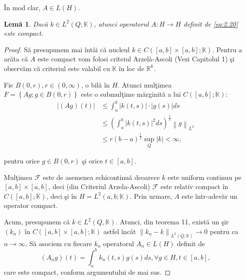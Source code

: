\documentclass[a4paper,12pt,oneside]{report}
\newtheorem{lemma}{Lem\u{a}}
\begin{document}
\noindent \^{I}n mod clar, \(A \in L\left ( H \right )\).

\begin{lemma}
Dac\u{a} \(k\in L^{2}\left ( Q;\mathbb{K} \right )\), atunci operatorul \(A : H \rightarrow H\) definit de \ref{eq:2.20} este compact.
\end{lemma}


\begin{proof}

S\u{a} presupunem mai \^{i}nt\^{a}i c\u{a} nucleul \(k \in C\left ( \left [ a,b \right ]  \times \left [ a,b \right ]; \mathbb{K}\right )\). Pentru a ar\u{a}ta c\u{a} \(A\) este compact  vom folosi criteiul Arzelà-Ascoli (Vezi Capitolul 1) \c{s}i observ\u{a}m c\u{a} criteriul este valabil cu \(\mathbb{K}\) \^{i}n loc de \(\mathbb{R}^{k}\).

Fie \(B\left ( 0,r \right ), r\in \left ( 0,\infty  \right )\), o bil\u{a} \^{i}n \(H\). Atunci mul\c{t}imea \(F = \left \{ Ag; g\in B\left ( 0,r \right ) \right \}\) este o submul\c{t}ime m\u{a}rginit\u{a} a lui \(C\left ( \left [ a,b \right ];\mathbb{K}  \right )\):
\begin{equation} \nonumber
    \begin{split}
    \left | \left ( Ag \right )\left ( t \right ) \right | & \leq \int_{a}^{b}\left | k\left ( t,s \right ) \right |\cdot \left | g\left ( s \right ) \right |ds  \\ & \leq \left ( \int_{a}^{b} \left | k\left ( t,s \right ) \right |^{2}ds \right )^{\frac{1}{2}}\left \| g \right \|_{L^{2}} \\ & \leq r\left ( b-a \right )^{\frac{1}{2}}\sup_{Q}\left | k \right | < \infty,
   \end{split}
\end{equation}

\noindent pentru orice \(g \in B\left ( 0,r \right )\) \c{s}i orice \(t\in \left [ a,b \right ]\).

Mul\c{t}imea \( \mathcal{F}\) este de asemenea echicontinu\u{a} deoarece  \(k\) este uniform continuu pe \(\left [ a,b \right ] \times \left [ a,b \right ]\), deci (din Criteriul Arzela-Ascoli) \( \mathcal{F}\) este relativ compact \^{i}n \(C\left ( \left [ a,b \right ];\mathbb{K} \right )\), deci \c{s}i \^{i}n \(H = L^{2}\left ( a,b;\mathbb{K} \right )\).
Prin urmare, \(A\) este \^{i}ntr-adev\u{a}r un operator compact.

Acum, presupunem c\u{a} \(k \in L^{2}\left ( Q,\mathbb{K} \right )\).  Atunci, din teorema 11, exist\u{a} un \c{s}ir \(\left (k_{n}  \right )\) \^{i}n \(C\left ( \left [ a,b \right ] \times  \left [ a,b \right ];\mathbb{K} \right )\) astfel \^{i}nc\^{a}t \(\left \| k_{n} -k \right \|_{L^{2}\left ( Q;\mathbb{K} \right )}\rightarrow 0\)  pentru ca \(n\rightarrow \infty\). S\u{a} asociem cu fiecare \(k_{n}\) operatorul \(A_{n} \in L\left ( H \right )\) definit de
\begin{displaymath}
\left (A_{n}g \right )\left ( t \right ) = \int_{a}^{b}k_{n}\left ( t,s \right )g\left ( s \right )ds, \forall g\in H, t\in \left [ a,b \right ],
\end{displaymath}
care este compact, conform argumentului de mai sus.


\end{proof}
\end{document}
